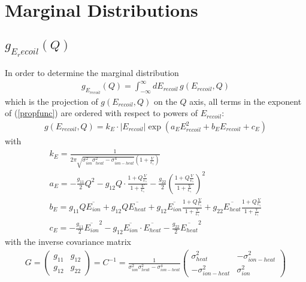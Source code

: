\section{Marginal Distributions}
\subsection{$g_{E_recoil}(Q)$}
In order to determine the marginal distribution
\begin{gather}
g_{E_{recoil}}(Q) = \int_{-\infty}^\infty dE_{recoil} \, g(E_{recoil},Q)
\end{gather}
which is the projection of $g(E_{recoil},Q)$ on the $Q$ axis, 
all terms in the exponent of (\ref{propfunc}) are ordered 
with respect to powers of $E_{recoil}$:
\begin{gather}
g(E_{recoil},Q) = k_E \cdot \left| E_{recoil} \right|  \exp ( a_E E_{recoil}^2 +
b_E E_{recoil} + c_E ) \label{propfuncE}
\end{gather}
with
\begin{gather}
k_E = \frac{1}{2 \pi \sqrt{\sigma_{ion}^2 \sigma_{heat}^2 - \sigma_{ion-heat}^4}
 \left(1 + \frac{V}{\epsilon_\gamma}\right)} \\
a_E = - \frac{g_{11}}{2} Q^2  - g_{12} Q \cdot
\frac{1 + Q \frac{V}{\epsilon_\gamma}}{1+ \frac{V}{\epsilon_\gamma}} 
- \frac{g_{22}}{2} \left( \frac{1 + Q \frac{V}{\epsilon_\gamma}}{1+ \frac{V}{\epsilon_\gamma}}  \right)^2 \\
b_E = g_{11} Q \overline{E_{ion}} + g_{12} Q \overline{E_{heat}}
 + g_{12} \overline{E_{ion}} 
\frac{1 + Q \frac{V}{\epsilon_\gamma}}{1+ \frac{V}{\epsilon_\gamma}} 
 + g_{22} \overline{E_{heat}} 
\frac{1 + Q \frac{V}{\epsilon_\gamma}}{1+ \frac{V}{\epsilon_\gamma}} \\
c_E = - \frac{g_{11}}{2} \overline{E_{ion}}^2 - g_{12} \overline{E_{ion}} \cdot
 \overline{E_{heat}} - \frac{g_{22}}{2} \overline{E_{heat}}^2
\end{gather}
with the inverse covariance matrix 
\begin{gather}
G = \begin{pmatrix} g_{11} & g_{12} \\ g_{12} & g_{22} \end{pmatrix}
= C^{-1} = \frac{1}{\sigma_{ion}^2 \sigma_{heat}^2 - \sigma_{ion-heat}^4}
\begin{pmatrix} \sigma_{heat}^2 & - \sigma_{ion-heat}^2 \\
- \sigma_{ion-heat}^2 & \sigma_{ion}^2 \end{pmatrix}
\end{gather}
